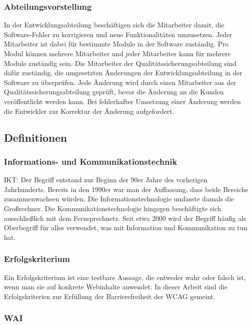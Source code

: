 \subsubsection{Abteilungsvorstellung}
In der Entwicklungsabteilung beschäftigen sich die Mitarbeiter damit, die Software-Fehler zu korrigieren und neue Funktionalitäten umzusetzen. Jeder Mitarbeiter ist dabei für bestimmte Module in der Software zuständig. Pro Modul können mehrere Mitarbeiter und jeder Mitarbeiter kann für mehrere Module zuständig sein. Die Mitarbeiter der Qualitätssicherungsabteilung sind dafür zuständig, die umgesetzten Änderungen der Entwicklungsabteilung in der Software zu überprüfen. Jede Änderung wird durch einen Mitarbeiter aus der Qualitätssicherungsabteilung geprüft, bevor die Änderung an die Kunden veröffentlicht werden kann. Bei fehlerhafter Umsetzung einer Änderung werden die Entwickler zur Korrektur der Änderung aufgefordert.

\subsection{Definitionen}

\subsubsection{Informations- und Kommunikationstechnik}
\ac{IKT}: Der Begriff entstand zur Beginn der 90er Jahre des vorherigen Jahrhunderts. Bereits in den 1990er war man der Auffassung, dass beide Bereiche zusammenwachsen würden. Die Informationstechnologie umfasste damals die Großrechner. Die Kommunikationstechnologie hingegen beschäftigte sich ausschließlich mit dem Fernsprechnetz. Seit etwa 2000 wird der Begriff häufig als Oberbegriff für alles verwendet, was mit Information und Kommunikation zu tun hat.

\subsubsection{Erfolgskriterium}
Ein Erfolgskriterium ist eine testbare Aussage, die entweder wahr oder falsch ist, wenn man sie auf konkrete Webinhalte anwendet. In dieser Arbeit sind die Erfolgskriterien zur Erfüllung der Barrierefreiheit der \ac{WCAG} gemeint.

\subsubsection{\ac{WAI}}

